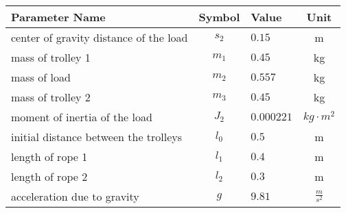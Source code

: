 \begin{tabular}{lclc}
\hline
 Parameter Name                         &  Symbol  & Value      &      Unit       \\
\hline
 center of gravity distance of the load & $s_{2}$  & $0.15$     &        m        \\
 mass of trolley 1                      & $m_{1}$  & $0.45$     &       kg        \\
 mass of load                           & $m_{2}$  & $0.557$    &       kg        \\
 mass of trolley 2                      & $m_{3}$  & $0.45$     &       kg        \\
 moment of inertia of the load          & $J_{2}$  & $0.000221$ & $kg \cdot m^2$  \\
 initial distance between the trolleys  & $l_{0}$  & $0.5$      &        m        \\
 length of rope 1                       & $l_{1}$  & $0.4$      &        m        \\
 length of rope 2                       & $l_{2}$  & $0.3$      &        m        \\
 acceleration due to gravity            &   $g$    & $9.81$     & $\frac{m}{s^2}$ \\
\hline
\end{tabular}